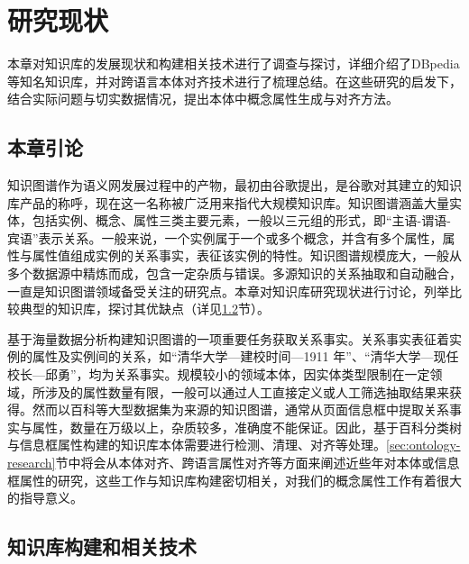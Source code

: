 \chapter{研究现状}
\label{cha:research}
本章对知识库的发展现状和构建相关技术进行了调查与探讨，详细介绍了DBpedia等知名知识库，并对跨语言本体对齐技术进行了梳理总结。在这些研究的启发下，结合实际问题与切实数据情况，提出本体中概念属性生成与对齐方法。

\section{本章引论}

知识图谱作为语义网发展过程中的产物，最初由谷歌提出，是谷歌对其建立的知识库产品的称呼，现在这一名称被广泛用来指代大规模知识库。知识图谱涵盖大量实体，包括实例、概念、属性三类主要元素，一般以三元组的形式，即“主语-谓语-宾语”表示关系。一般来说，一个实例属于一个或多个概念，并含有多个属性，属性与属性值组成实例的关系事实，表征该实例的特性。知识图谱规模庞大，一般从多个数据源中精炼而成，包含一定杂质与错误。多源知识的关系抽取和自动融合，一直是知识图谱领域备受关注的研究点。本章对知识库研究现状进行讨论，列举比较典型的知识库，探讨其优缺点（详见\ref{sec:knowledgebase-research}节）。

基于海量数据分析构建知识图谱的一项重要任务获取关系事实\cite{suchanek2014knowledge}。关系事实表征着实例的属性及实例间的关系，如“清华大学—建校时间—1911 年”、“清华大学—现任校长—邱勇”，均为关系事实。规模较小的领域本体，因实体类型限制在一定领域，所涉及的属性数量有限，一般可以通过人工直接定义\cite{boyce2007developing}或人工筛选抽取结果\cite{wang:movie}来获得。然而以百科等大型数据集为来源的知识图谱，通常从页面信息框中提取关系事实与属性，数量在万级以上，杂质较多，准确度不能保证。因此，基于百科分类树与信息框属性构建的知识库本体需要进行检测、清理、对齐等处理。\ref{sec:ontology-research}节中将会从本体对齐、跨语言属性对齐等方面来阐述近些年对本体或信息框属性的研究，这些工作与知识库构建密切相关，对我们的概念属性工作有着很大的指导意义。

\section{知识库构建和相关技术}
\label{sec:knowledgebase-research}

